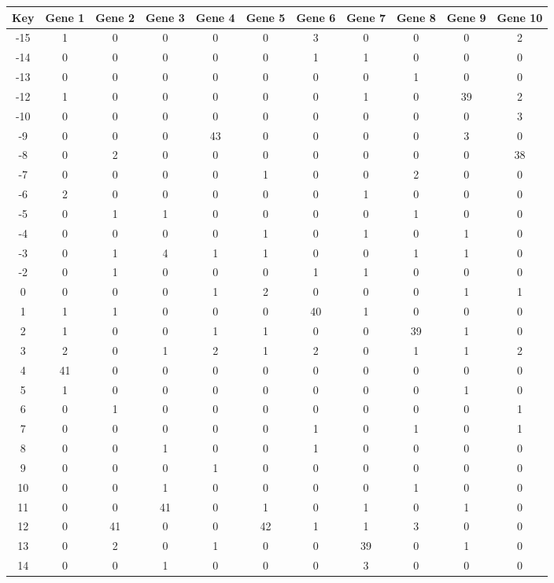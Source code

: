 \begin{tabular}{|c|c|c|c|c|c|c|c|c|c|c|}
\hline
Key & Gene 1 & Gene 2 & Gene 3 & Gene 4 & Gene 5 & Gene 6 & Gene 7 & Gene 8 & Gene 9 & Gene 10 \\
\hline
-15 & 1 & 0 & 0 & 0 & 0 & 3 & 0 & 0 & 0 & 2 \\
-14 & 0 & 0 & 0 & 0 & 0 & 1 & 1 & 0 & 0 & 0 \\
-13 & 0 & 0 & 0 & 0 & 0 & 0 & 0 & 1 & 0 & 0 \\
-12 & 1 & 0 & 0 & 0 & 0 & 0 & 1 & 0 & 39 & 2 \\
-10 & 0 & 0 & 0 & 0 & 0 & 0 & 0 & 0 & 0 & 3 \\
-9 & 0 & 0 & 0 & 43 & 0 & 0 & 0 & 0 & 3 & 0 \\
-8 & 0 & 2 & 0 & 0 & 0 & 0 & 0 & 0 & 0 & 38 \\
-7 & 0 & 0 & 0 & 0 & 1 & 0 & 0 & 2 & 0 & 0 \\
-6 & 2 & 0 & 0 & 0 & 0 & 0 & 1 & 0 & 0 & 0 \\
-5 & 0 & 1 & 1 & 0 & 0 & 0 & 0 & 1 & 0 & 0 \\
-4 & 0 & 0 & 0 & 0 & 1 & 0 & 1 & 0 & 1 & 0 \\
-3 & 0 & 1 & 4 & 1 & 1 & 0 & 0 & 1 & 1 & 0 \\
-2 & 0 & 1 & 0 & 0 & 0 & 1 & 1 & 0 & 0 & 0 \\
0 & 0 & 0 & 0 & 1 & 2 & 0 & 0 & 0 & 1 & 1 \\
1 & 1 & 1 & 0 & 0 & 0 & 40 & 1 & 0 & 0 & 0 \\
2 & 1 & 0 & 0 & 1 & 1 & 0 & 0 & 39 & 1 & 0 \\
3 & 2 & 0 & 1 & 2 & 1 & 2 & 0 & 1 & 1 & 2 \\
4 & 41 & 0 & 0 & 0 & 0 & 0 & 0 & 0 & 0 & 0 \\
5 & 1 & 0 & 0 & 0 & 0 & 0 & 0 & 0 & 1 & 0 \\
6 & 0 & 1 & 0 & 0 & 0 & 0 & 0 & 0 & 0 & 1 \\
7 & 0 & 0 & 0 & 0 & 0 & 1 & 0 & 1 & 0 & 1 \\
8 & 0 & 0 & 1 & 0 & 0 & 1 & 0 & 0 & 0 & 0 \\
9 & 0 & 0 & 0 & 1 & 0 & 0 & 0 & 0 & 0 & 0 \\
10 & 0 & 0 & 1 & 0 & 0 & 0 & 0 & 1 & 0 & 0 \\
11 & 0 & 0 & 41 & 0 & 1 & 0 & 1 & 0 & 1 & 0 \\
12 & 0 & 41 & 0 & 0 & 42 & 1 & 1 & 3 & 0 & 0 \\
13 & 0 & 2 & 0 & 1 & 0 & 0 & 39 & 0 & 1 & 0 \\
14 & 0 & 0 & 1 & 0 & 0 & 0 & 3 & 0 & 0 & 0 \\
\hline
\end{tabular}